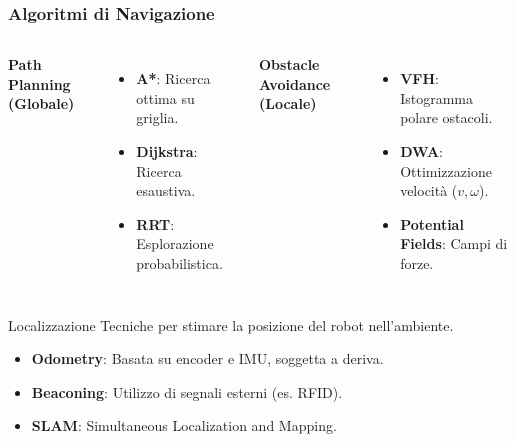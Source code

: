 \begin{frame}
    \frametitle{Algoritmi di Navigazione}
    \begin{columns}
        \textbf{Path Planning (Globale)}
        \begin{itemize}
            \item \textbf{A*}: Ricerca ottima su griglia.
            \item \textbf{Dijkstra}: Ricerca esaustiva.
            \item \textbf{RRT}: Esplorazione probabilistica.
        \end{itemize}

        \textbf{Obstacle Avoidance (Locale)}
        \begin{itemize}
            \item \textbf{VFH}: Istogramma polare ostacoli.
            \item \textbf{DWA}: Ottimizzazione velocità ($v, \omega$).
            \item \textbf{Potential Fields}: Campi di forze.
        \end{itemize}
    \end{columns}
    \begin{block}{Localizzazione}
        Tecniche per stimare la posizione del robot nell'ambiente.
        \begin{itemize}
            \item \textbf{Odometry}: Basata su encoder e IMU, soggetta a deriva.
            \item \textbf{Beaconing}: Utilizzo di segnali esterni (es. RFID).
            \item \textbf{SLAM}: Simultaneous Localization and Mapping.
        \end{itemize}
    \end{block}
\end{frame}

